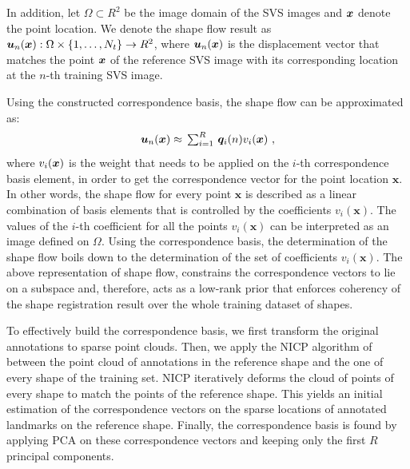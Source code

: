 In addition, let $\Omega \subset R^2$ be the image domain of the SVS images and $\bm{x}$ denote the point location. We denote the shape flow result as $\bm{u}_n(\bm{x}):\Omega\times \{1,\dots,N_t\} \rightarrow R^2$,  where $\bm{u}_n(\bm{x})$ is the displacement vector that matches the point $\bm{x}$ of the reference SVS image with its corresponding location at the $n$-th training SVS image.

Using the constructed correspondence basis, the shape flow can be approximated as:
\begin{equation}\label{eq:LinTrajModel}
    \bm{u}_n(\bm{x}) \approx
    \textstyle \, \sum_{i=1}^R \, \bm{q}_i(n)v_i(\bm{x}) \,\, ,
\end{equation}
where $v_i(\bm{x})$ is the weight that needs to be applied on the $i$-th correspondence basis element, in order to get the correspondence vector for the point location $\bm{x}$. In other words, the shape flow for every point $\bm{x}$ is described as a linear combination of basis elements that is controlled by the coefficients $v_i(\bm{x})$.
The values of the $i$-th coefficient for all the points $v_i(\bm{x})$ can be interpreted as an image defined on $\Omega$. Using the correspondence basis, the determination of the shape flow boils down to the determination of the set of coefficients $v_i(\bm{x})$. The above representation of shape flow, constrains the correspondence vectors to lie on a subspace and, therefore, acts as a low-rank prior that enforces coherency of the shape registration result over the whole training dataset of shapes.


To effectively build the correspondence basis, we first transform the original annotations to sparse point clouds. Then, we apply the NICP algorithm of \cite{Amber2007} between the point cloud of annotations in the reference shape and the one of every shape of the training set. NICP iteratively deforms the cloud of points of every shape to match the points of the reference shape. This yields an initial estimation of the correspondence vectors on the sparse locations of annotated landmarks on the reference shape. Finally, the correspondence basis is found by applying PCA on these correspondence vectors and keeping only the first $R$ principal components.



